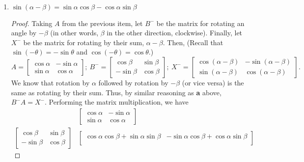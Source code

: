 \documentclass{article}
\begin{document}
\begin{enumerate}
\begin{enumerate}
\begin{proof}
\[\begin{bmatrix}
                \end{bmatrix} 
            \] gives us \(\sin(\alpha + \beta) = \sin\alpha\cos\beta + \cos\alpha\sin\beta\), which proves the identity. 
        \end{proof}
        \item \(\sin(\alpha - \beta) = \sin\alpha\cos\beta - \cos\alpha\sin\beta\)\begin{proof}
            Taking \(A\) from the previous item, let \(B^-\) be the matrix for rotating an angle by \(-\beta\) (in other words, \(\beta\) in the other direction, clockwise). Finally, let \(X^-\) be the matrix for rotating by their sum, \(\alpha -\beta\). Then, 
            (Recall that \(\sin(-\theta) = -\sin\theta\) and \(\cos(-\theta) = \cos\theta\).)\[
                A = \begin{bmatrix}
                    \cos\alpha&-\sin\alpha \\ \sin\alpha&\cos\alpha
                \end{bmatrix};~B^- = \begin{bmatrix}
                    \cos\beta&\sin\beta \\ -\sin\beta&\cos\beta
                \end{bmatrix};~X^- =  \begin{bmatrix}
                    \cos(\alpha - \beta)&-\sin(\alpha - \beta) \\ \sin(\alpha-\beta)&\cos(\alpha - \beta)
                \end{bmatrix}.
            \] We know that rotation by \(\alpha\) followed by rotation by \(-\beta\) (or vice versa) is the same as rotating by their sum. Thus, by similar reasoning as \textbf{a} above, \(B^-A = X^-\). Performing the matrix multiplication, we have\begin{align*} 
                &\begin{bmatrix}
                    \cos\alpha&-\sin\alpha \\ \sin\alpha&\cos\alpha
                \end{bmatrix} \\
                \begin{bmatrix}
                    \cos\beta&\sin\beta \\ -\sin\beta&\cos\beta
                \end{bmatrix} & \begin{bmatrix}
                    \cos\alpha\cos\beta + \sin\alpha\sin\beta&-\sin\alpha\cos\beta+\cos\alpha\sin\beta \\ 

\end{bmatrix}
\end{align*}
\end{proof}
\end{enumerate}
\end{enumerate}
\end{document}
